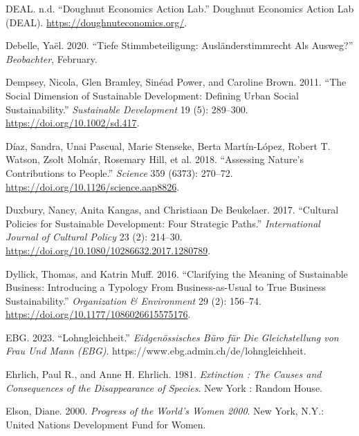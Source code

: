 \documentclass[
  a4paper,
  openany]{book}
\newlength{\cslhangindent}
\newenvironment{CSLReferences}[2] %
 {\begin{list}{}{%
  \setlength{\itemindent}{0pt}
  \setlength{\leftmargin}{0pt}
  \setlength{\parsep}{0pt}
  \ifodd #1
   \setlength{\leftmargin}{\cslhangindent}
   \setlength{\itemindent}{-1\cslhangindent}
  \fi
  \setlength{\itemsep}{#2\baselineskip}}}
 {\end{list}}
\begin{document}
\begin{CSLReferences}{1}{0}
DEAL. n.d. {``Doughnut {Economics} {Action} {Lab}.''} Doughnut Economics
Action Lab (DEAL). \url{https://doughnuteconomics.org/}.

Debelle, Yaël. 2020. {``{Tiefe Stimmbeteiligung: Ausl{ä}nderstimmrecht
Als Ausweg?}''} \emph{Beobachter}, February.

Dempsey, Nicola, Glen Bramley, Sinéad Power, and Caroline Brown. 2011.
{``The Social Dimension of Sustainable Development: {Defining} Urban
Social Sustainability.''} \emph{Sustainable Development} 19 (5):
289--300. \url{https://doi.org/10.1002/sd.417}.

Díaz, Sandra, Unai Pascual, Marie Stenseke, Berta Martín-López, Robert
T. Watson, Zsolt Molnár, Rosemary Hill, et al. 2018. {``Assessing
Nature's Contributions to People.''} \emph{Science} 359 (6373): 270--72.
\url{https://doi.org/10.1126/science.aap8826}.

Duxbury, Nancy, Anita Kangas, and Christiaan De Beukelaer. 2017.
{``Cultural Policies for Sustainable Development: Four Strategic
Paths.''} \emph{International Journal of Cultural Policy} 23 (2):
214--30. \url{https://doi.org/10.1080/10286632.2017.1280789}.

Dyllick, Thomas, and Katrin Muff. 2016. {``Clarifying the {Meaning} of
{Sustainable Business}: {Introducing} a {Typology From
Business-as-Usual} to {True Business Sustainability}.''}
\emph{Organization \& Environment} 29 (2): 156--74.
\url{https://doi.org/10.1177/1086026615575176}.

EBG. 2023. {``Lohngleichheit.''} \emph{Eidgen{ö}ssisches B{ü}ro f{ü}r
Die Gleichstellung von Frau Und Mann (EBG)}.
https://www.ebg.admin.ch/de/lohngleichheit.

Ehrlich, Paul R., and Anne H. Ehrlich. 1981. \emph{Extinction : The
Causes and Consequences of the Disappearance of Species}. New York :
Random House.

Elson, Diane. 2000. \emph{Progress of the World's Women 2000}. New York,
N.Y.: United Nations Development Fund for Women.


\end{CSLReferences}
\end{document}
